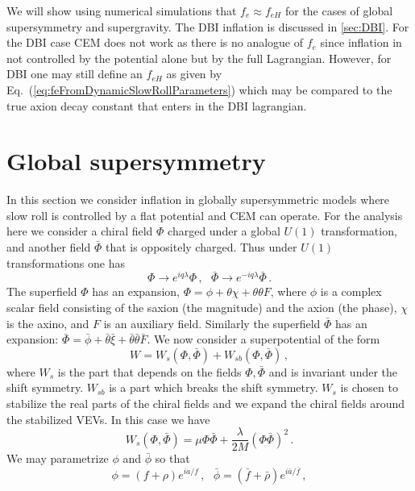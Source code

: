\documentclass[12pt]{article}
\begin{document}
We will show using numerical simulations that $f_e \approx f_{eH}$ for the cases of global supersymmetry and supergravity.
The DBI inflation is discussed in \ref{sec:DBI}.
For the DBI case CEM does not work as there is no analogue of $f_e$ since inflation in not controlled by the potential alone but by the full Lagrangian.
However, for DBI one may still define an $f_{eH}$ as given by Eq.~(\ref{eq:feFromDynamicSlowRollParameters}) which may be compared to the true axion decay constant that enters in the DBI lagrangian.

\section{Global supersymmetry \label{sec:Supersymmetry}}
In this section we consider inflation in globally supersymmetric models where slow roll  is controlled by a flat potential and CEM can operate.
For the analysis here we consider a chiral field $\Phi$ charged under a global $U\left(1\right)$ transformation, and another field $\bar\Phi$ that is oppositely charged.
Thus under $U\left(1\right)$ transformations one has
\begin{equation}
  \Phi \to e^{i q \lambda} \Phi\,,
  ~~~ \bar\Phi \to e^{-i q \lambda} \bar\Phi\,.
\end{equation}
The superfield $\Phi$ has an expansion, $\Phi = \phi + \theta \chi + \theta \theta F$, where $\phi$ is a complex scalar field consisting of the saxion (the magnitude) and the axion (the phase), $\chi$ is the axino, and $F$ is an auxiliary field.
Similarly the superfield $\bar\Phi$ has an expansion: $\bar\Phi = \bar\phi + \bar\theta \bar\xi + \bar\theta \bar\theta \bar F$.
We now consider a superpotential of the form
\begin{equation} \label{eq:supersymmetry:W}
  W = W_s\left(\Phi, \bar\Phi\right) + W_{sb}\left(\Phi, \bar\Phi\right)\,,
\end{equation}
where $W_s$ is the part that depends on the fields $\Phi, \bar\Phi$ and is invariant under the shift symmetry.
$W_{sb}$ is a part which breaks the shift symmetry.
$W_s$ is chosen to stabilize the real parts of the chiral fields and we expand the chiral fields around the stabilized VEVs.
In this case we have
\begin{equation}
  W_s\left(\Phi, \bar\Phi\right) =
    \mu \Phi \bar\Phi + \frac{\lambda}{2 M} \left(\Phi \bar\Phi\right)^2\,.
\end{equation}
We may parametrize $\phi$ and $\bar\phi$ so that
\begin{equation}
  \phi = \left(f + \rho\right) e^{i a / f}\,,
  ~~~ \bar\phi = \left(\bar f + \bar\rho\right) e^{i \bar a / \bar f}\,,
\end{equation}
\end{document}
